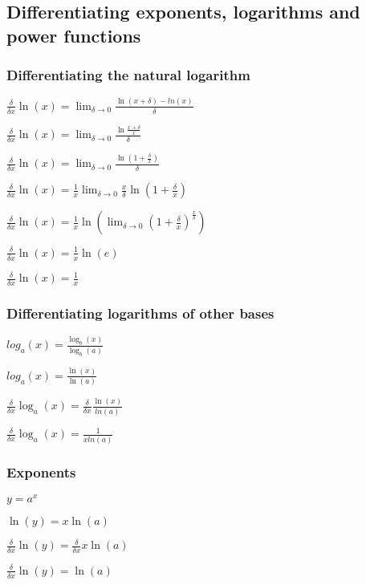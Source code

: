 
\subsection{Differentiating exponents, logarithms and power functions}

\subsubsection{Differentiating the natural logarithm}

\(\frac{\delta }{\delta x}\ln (x)=\lim_{\delta \rightarrow 0}\frac{\ln(x+\delta)-ln(x)}{\delta }\)

\(\frac{\delta }{\delta x}\ln (x)=\lim_{\delta \rightarrow 0}\frac{\ln\frac{x+\delta}{x}}{\delta }\)

\(\frac{\delta }{\delta x}\ln (x)=\lim_{\delta \rightarrow 0}\frac{\ln(1+\frac{\delta}{x})}{\delta }\)

\(\frac{\delta }{\delta x}\ln (x)=\frac{1}{x}\lim_{\delta \rightarrow 0}\frac{x}{\delta}\ln(1+\frac{\delta}{x})\)

\(\frac{\delta }{\delta x}\ln (x)=\frac{1}{x}\ln(\lim_{\delta \rightarrow 0}(1+\frac{\delta}{x})^{\frac{x}{\delta }})\)

\(\frac{\delta }{\delta x}\ln (x)=\frac{1}{x}\ln(e)\)

\(\frac{\delta }{\delta x}\ln (x)=\frac{1}{x}\)

\subsubsection{Differentiating logarithms of other bases}

\(log_a(x)=\frac{\log_b(x)}{\log_b(a)}\)

\(log_a(x)=\frac{\ln(x)}{\ln(a)}\)

\(\frac{\delta }{\delta x}\log_a(x)=\frac{\delta }{\delta x}\frac{\ln(x)}{ln(a)}\)

\(\frac{\delta }{\delta x}\log_a(x)=\frac{1}{xln(a)}\)

\subsubsection{Exponents}

\(y=a^x\)

\(\ln(y)=x\ln(a)\)

\(\frac{\delta }{\delta x}\ln(y)=\frac{\delta }{\delta x}x\ln(a)\)

\(\frac{\delta }{\delta x}\ln(y)=\ln(a)\)

